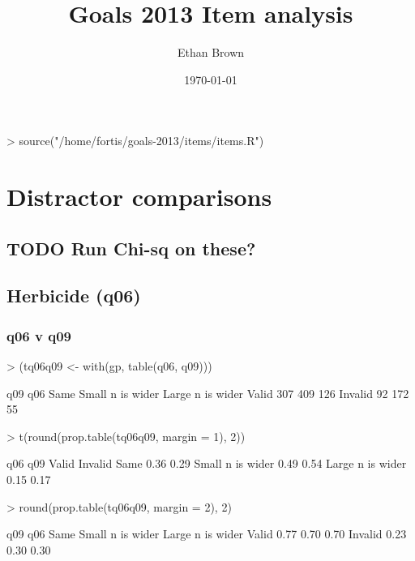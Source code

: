 \documentclass[11pt]{article}
\author{Ethan Brown}
\date{\today}
\title{Goals 2013 Item analysis}
\begin{document}
\maketitle
\begin{Schunk}
\begin{Sinput}
> source("/home/fortis/goals-2013/items/items.R")
\end{Sinput}
\end{Schunk}

\section{Distractor comparisons}
\label{sec-1}

\subsection{{\bfseries\sffamily TODO} Run Chi-sq on these?}
\label{sec-1-1}
\subsection{Herbicide (q06)}
\label{sec-1-2}
\subsubsection{q06 v q09}
\label{sec-1-2-1}
\begin{Schunk}
\begin{Sinput}
> (tq06q09 <- with(gp, table(q06, q09)))
\end{Sinput}
\begin{Soutput}
         q09
q06       Same Small n is wider Large n is wider
  Valid    307              409              126
  Invalid   92              172               55
\end{Soutput}
\begin{Sinput}
> t(round(prop.table(tq06q09, margin = 1), 2))
\end{Sinput}
\begin{Soutput}
                  q06
q09                Valid Invalid
  Same              0.36    0.29
  Small n is wider  0.49    0.54
  Large n is wider  0.15    0.17
\end{Soutput}
\begin{Sinput}
> round(prop.table(tq06q09, margin = 2), 2)
\end{Sinput}
\begin{Soutput}
         q09
q06       Same Small n is wider Large n is wider
  Valid   0.77             0.70             0.70
  Invalid 0.23             0.30             0.30
\end{Soutput}
\end{Schunk}
\end{document}

